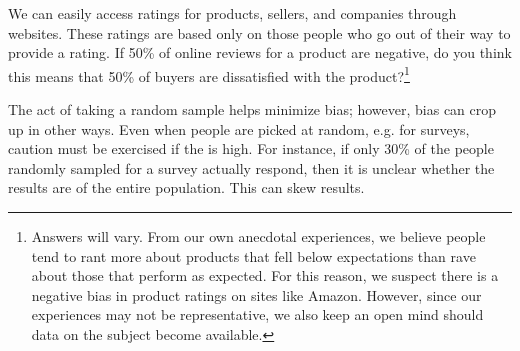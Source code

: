 
\begin{exercise}
We can easily access ratings for products, sellers, and companies through websites. These ratings are based only on those people who go out of their way to provide a rating. If 50\% of online reviews for a product are negative, do you think this means that 50\% of buyers are dissatisfied with the product?\footnote{Answers will vary. From our own anecdotal experiences, we believe people tend to rant more about products that fell below expectations than rave about those that perform as expected. For this reason, we suspect there is a negative bias in product ratings on sites like Amazon. However, since our experiences may not be representative, we also keep an open mind should data on the subject become available.}
\end{exercise}

The act of taking a random sample helps minimize bias; however, bias can crop up in other ways.  Even when people are picked at random, e.g. for surveys, caution must be exercised if the   is high.  For instance, if only 30\% of the people randomly sampled for a survey actually respond, then it is unclear whether the results are  of the entire population. This   can skew results.

